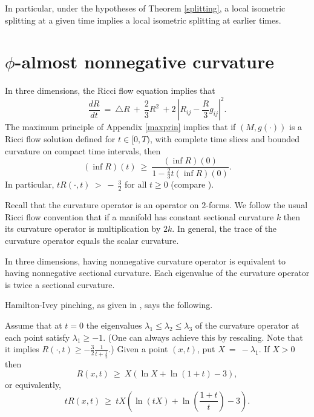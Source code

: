 In particular, under the hypotheses of Theorem \ref{splitting}, a
local isometric splitting at a given time implies a local
isometric splitting at earlier times.


\section{$\phi$-almost nonnegative curvature}
\label{phiappendix}

In three dimensions,
the Ricci flow equation implies that
\begin{equation} \label{3dR}
\frac{dR}{dt} \: = \:
\triangle R \: + \: \frac{2}{3} R^2 \: +
2 \: |R_{ij} - \frac{R}{3} g_{ij}|^2 .
\end{equation}
The maximum principle of Appendix \ref{maxprin} implies that
if $(M, g(\cdot))$ is a Ricci flow solution defined for
$t \in [0, T)$, with complete time slices and bounded curvature
on compact time intervals, then
\begin{equation} \label{Rlowerbound}
(\inf R)(t) \: \ge \:
\frac{(\inf R)(0)}
{1 - \frac23 t (\inf R)(0)}.
\end{equation}
In particular,
$tR(\cdot, t) \: > \: - \: \frac{3}{2}$ for all $t \ge 0$
(compare \cite[Section 2]{Hamiltonn}).

Recall that the curvature operator is an operator on $2$-forms.
We follow the usual Ricci flow convention that if a manifold
has constant sectional curvature $k$ then its curvature operator
is multiplication by $2k$. In general, the trace of the
curvature operator equals the scalar curvature.

In three dimensions, having nonnegative
curvature operator is equivalent to having nonnegative
sectional curvature.  Each eigenvalue of the curvature operator
is twice a sectional curvature.

Hamilton-Ivey pinching, as given
in \cite[Theorem 4.1]{Hamiltonn}, says the following.

Assume that at $t = 0$ the eigenvalues $\lambda_1 \le \lambda_2 \le
\lambda_3$ of the
curvature operator at each point satisfy $\lambda_1 \ge -1$.
(One can
always achieve this by rescaling. Note that it implies
$R(\cdot, t) \ge - \frac32 \frac{1}{t+\frac12}$.)
Given a point $(x, t)$, put $X \: = \: - \lambda_1$.
If $X > 0$ then
\begin{equation}
R(x, t) \: \ge \: X \left( \ln X + \ln(1+t) - 3 \right),
\end{equation}
or equivalently,
\begin{equation} \label{estimate}
tR(x, t) \: \ge \: tX \left( \ln(tX) + \ln(\frac{1+t}{t}) - 3 \right).
\end{equation}


